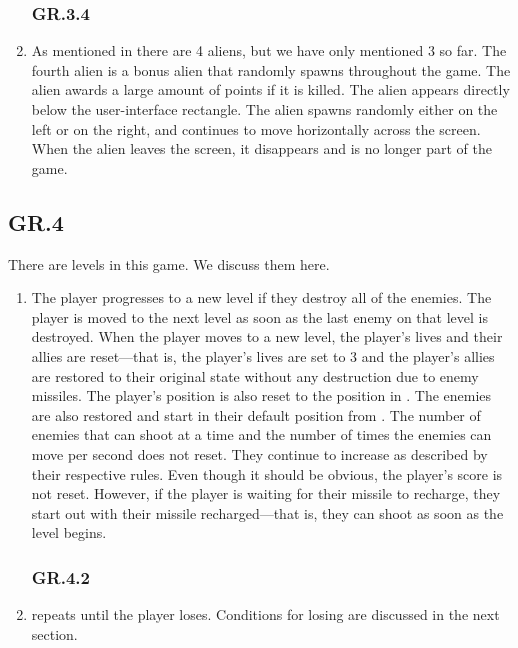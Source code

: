 \documentclass[12pt, letterpaper]{article}
\begin{document}
\begin{enumerate}[label=]
        \subsubsection*{GR.3.4}
        \item As mentioned in  there are 4 aliens, but we have only mentioned 3 so far. The fourth alien is a bonus alien that randomly spawns throughout the game. The alien awards a large amount of points if it is killed. The alien appears directly below the user-interface rectangle. The alien spawns randomly either on the left or on the right, and continues to move horizontally across the screen. When the alien leaves the screen, it disappears and is no longer part of the game. 
    \end{enumerate}
    \subsection*{GR.4}
    There are levels in this game. We discuss them here. 
    \begin{enumerate}[label=]
        \subsubsection*{GR.4.1}
        \label{levels}
        \item The player progresses to a new level if they destroy all of the enemies. The player is moved to the next level as soon as the last enemy on that level is destroyed. When the player moves to a new level, the player's lives and their allies are reset---that is, the player's lives are set to 3 and the player's allies are restored to their original state without any destruction due to enemy missiles. The player's position is also reset to the position in . The enemies are also restored and start in their default position from . The number of enemies that can shoot at a time and the number of times the enemies can move per second does not reset. They continue to increase as described by their respective rules. Even though it should be obvious, the player's score is not reset. However, if the player is waiting for their missile to recharge, they start out with their missile recharged---that is, they can shoot as soon as the level begins. 
        \subsubsection*{GR.4.2}
        \item {} repeats until the player loses. Conditions for losing are discussed in the next section. 
    \end{enumerate}
\end{document}
